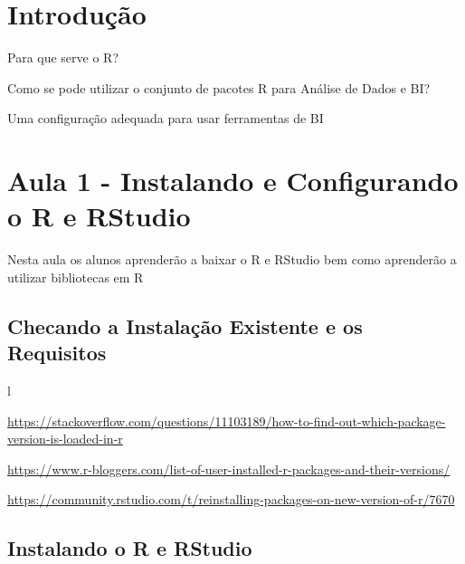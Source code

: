 \documentclass[12pt,a4paper,oneside]{erdc}\usepackage[]{graphicx}\usepackage[]{color}
\begin{document}







\maketitle

\tableofcontents




\mainmatter


\chapter{Introdução }

Para que serve o R?

Como se pode utilizar o conjunto de pacotes R para Análise de Dados e BI?

Uma configuração adequada para usar ferramentas de BI 

\chapter{Aula 1 - Instalando e Configurando o R e RStudio}

Nesta aula os alunos aprenderão a baixar o R e RStudio bem como aprenderão a utilizar bibliotecas em R

\section{Checando a Instalação Existente e os Requisitos}l

\url{https://stackoverflow.com/questions/11103189/how-to-find-out-which-package-version-is-loaded-in-r}

\url{https://www.r-bloggers.com/list-of-user-installed-r-packages-and-their-versions/}

\url{https://community.rstudio.com/t/reinstalling-packages-on-new-version-of-r/7670}

\section{Instalando o R e RStudio}
\end{document}
